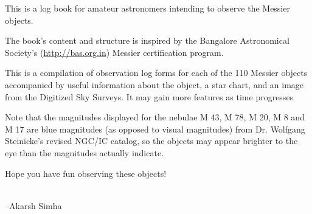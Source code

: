 This is a log book for amateur astronomers intending to observe the
Messier objects.

The book's content and structure is inspired by the Bangalore
Astronomical Society's (\url{http://bas.org.in}) Messier certification
program.

This is a compilation of observation log forms for each of the 110
Messier objects accompanied by useful information about the object, a
star chart, and an image from the Digitized Sky Surveys. It may gain
more features as time progresses

Note that the magnitudes displayed for the nebulae M 43, M 78, M 20, M
8 and M 17 are blue magnitudes (as opposed to visual magnitudes) from
Dr. Wolfgang Steinicke's revised NGC/IC catalog, so the objects may
appear brighter to the eye than the magnitudes actually indicate.

Hope you have fun observing these objects!

\\

\hfill --Akarsh Simha
